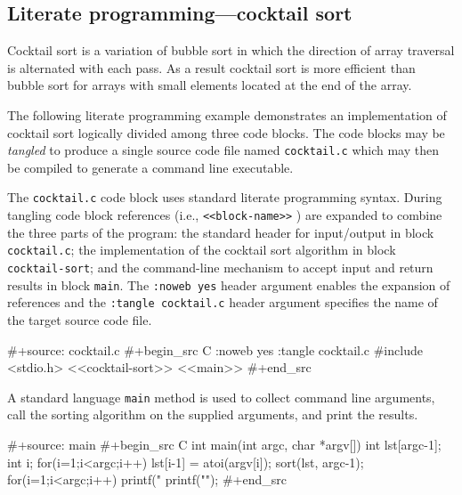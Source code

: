 \documentclass[article,shortnames]{jss}
\begin{document}
\subsection{Literate programming---cocktail sort}
\label{sec-4-2}

Cocktail sort \cite{rosettacode} is a variation of bubble sort in which
the direction of array traversal is alternated with each pass.  As a
result cocktail sort is more efficient than bubble sort for arrays
with small elements located at the end of the array.

The following literate programming example demonstrates an
implementation of cocktail sort logically divided among three code
blocks.  The code blocks may be \emph{tangled} to produce a single source
code file named \texttt{cocktail.c} which may then be compiled to generate a
command line executable.

The \texttt{cocktail.c} code block uses standard literate programming
syntax.  During tangling code block references
(i.e.,
  \verb=<<block-name>>=
) are expanded to combine the three parts of the program: the standard
 header for input/output in block \texttt{cocktail.c}; the implementation of
the cocktail sort algorithm in block \texttt{cocktail-sort}; and the
command-line mechanism to accept input and return results in block
\texttt{main}.  The \texttt{:noweb yes} header argument enables the expansion of
 references and the \texttt{:tangle cocktail.c} header argument
specifies the name of the target source code file.


\begin{Code}
#+source: cocktail.c
#+begin_src C :noweb yes :tangle cocktail.c
  #include <stdio.h>
  <<cocktail-sort>>
  <<main>>
#+end_src
\end{Code}






A standard  language \texttt{main} method is used to collect command line
arguments, call the sorting algorithm on the supplied arguments, and
print the results.


\begin{Code}
#+source: main
#+begin_src C
  int main(int argc, char *argv[]) {
    int lst[argc-1];
    int i;
    for(i=1;i<argc;i++)
      lst[i-1] = atoi(argv[i]);
    sort(lst, argc-1);
    for(i=1;i<argc;i++)
      printf("%
    printf("\n");
  }
#+end_src
\end{Code}
\end{document}
